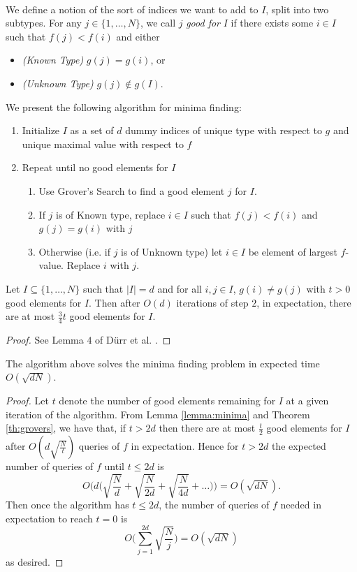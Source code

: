 \paragraph{}
We define a notion of the sort of indices we want to add to $I$, split into two subtypes. For any $j \in \{1, \dots, N\}$, we call $j$ {\it good for} $I$ if there exists some $i \in I$ such that $f(j) < f(i)$ and either
\begin{itemize}
\item {\it(Known Type)} $g(j) = g(i)$, or 
\item {\it(Unknown Type)} $g(j) \not\in g(I)$.
\end{itemize}
We present the following algorithm for minima finding:
\begin{enumerate}
\item Initialize $I$ as a set of $d$ dummy indices of unique type with respect to $g$ and unique maximal value with respect to $f$
\item Repeat until no good elements for $I$
	\begin{enumerate}
	\item Use Grover's Search to find a good element $j$ for $I$.
	\item If $j$ is of Known type, replace $i \in I$ such that $f(j) < f(i)$ and $g(j) = g(i)$ with $j$
	\item Otherwise (i.e. if $j$ is of Unknown type) let $i \in I$ be element of largest $f$-value. Replace $i$ with $j$.
	\end{enumerate}
\end{enumerate}
\begin{lemma}\label{lemma:minima}Let $I \subseteq \{1,\dots, N\}$ such that $|I| = d$ and for all $i,j \in I$, $g(i) \neq g(j)$ with $t>0$ good elements for $I$. Then after $O(d)$ iterations of step $2$, in expectation, there are at most $\frac{3}{4}t$ good elements for $I$.
\end{lemma}
\begin{proof}
See Lemma $4$ of D{\"u}rr et al. \cite{durr2004quantum}.
\end{proof}
\begin{theorem}\label{th:minima}
The algorithm above solves the minima finding problem in expected time $O(\sqrt{dN})$.
\end{theorem}
\begin{proof}
Let $t$ denote the number of good elements remaining for $I$ at a given iteration of the algorithm. From Lemma \ref{lemma:minima} and Theorem \ref{th:grovers}, we have that, if $t > 2d$ then there are at most $\frac{t}{2}$ good elements for $I$ after $O(d\sqrt{\frac{N}{t}})$ queries of $f$ in expectation. Hence for $t>2d$ the expected number of queries of $f$ until $t\leq 2d$ is
$$O\big(d\big(\sqrt{\frac{N}{d}} + \sqrt{\frac{N}{2d}} + \sqrt{\frac{N}{4d}} + \dots\big)\big) = O(\sqrt{dN}).$$
Then once the algorithm has $t \leq 2d$, the number of queries of $f$ needed in expectation to reach $t=0$ is
$$O\big(\sum_{j=1}^{2d}\sqrt{\frac{N}{j}}\big) = O(\sqrt{dN})$$
as desired.
\end{proof}
